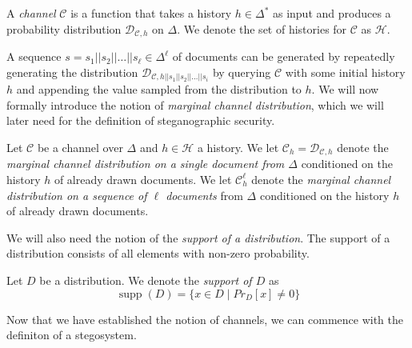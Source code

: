 \begin{definition}[Channel]
A \emph{channel} $\mathcal{C}$ is a function that takes a history $h \in \Delta^*$ as input and produces a probability distribution $\mathcal{D}_{\mathcal{C},h}$ on $\Delta$.
We denote the set of histories for $\mathcal{C}$ as $\mathcal{H}$.
\end{definition}

A sequence $s = s_1||s_2||\dots||s_\ell \in \Delta^\ell$ of documents can be generated by repeatedly generating the distribution $\mathcal{D}_{\mathcal{C},h||s_1||s_2||\dots||s_i}$ by querying $\mathcal{C}$ with some initial history $h$ and appending the value sampled from the distribution to $h$.
We will now formally introduce the notion of \emph{marginal channel distribution}, which we will later need for the definition of steganographic security.

\begin{definition}
Let $\mathcal{C}$ be a channel over $\Delta$ and $h \in \mathcal{H}$ a history.
We let $\mathcal{C}_h = \mathcal{D}_{\mathcal{C},h}$ denote the \emph{marginal channel distribution on a single document from $\Delta$} conditioned on the history $h$ of already drawn documents.
We let $\mathcal{C}_h^\ell$ denote the \emph{marginal channel distribution on a sequence of $\ell$ documents} from $\Delta$ conditioned on the history $h$ of already drawn documents.
\end{definition}
We will also need the notion of the \emph{support of a distribution}.
The support of a distribution consists of all elements with non-zero probability.

\begin{definition}[Support]
Let $D$ be a distribution.
We denote the \emph{support of $D$} as 
$$\mathop{supp}(D) = \{ x \in D \mid Pr_{D}[x] \neq 0 \}$$
\end{definition}

Now that we have established the notion of channels, we can commence with the definiton of a stegosystem.


